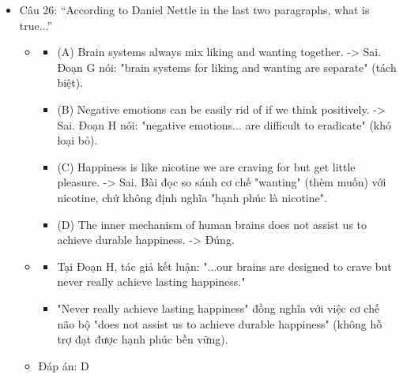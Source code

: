 \documentclass{../templateReading/cdreading}
\begin{document}
\begin{itemize}
\item Câu 26: “According to Daniel Nettle in the last two paragraphs, what is true...”
\begin{itemize}
\item {}
\begin{itemize}
\item (A) Brain systems always mix liking and wanting together. -> Sai. Đoạn G nói: "brain systems for liking and wanting are separate" (tách biệt).
\item (B) Negative emotions can be easily rid of if we think positively. -> Sai. Đoạn H nói: "negative emotions... are difficult to eradicate" (khó loại bỏ).
\item (C) Happiness is like nicotine we are craving for but get little pleasure. -> Sai. Bài đọc so sánh cơ chế "wanting" (thèm muốn) với nicotine, chứ không định nghĩa "hạnh phúc là nicotine".
\item (D) The inner mechanism of human brains does not assist us to achieve durable happiness. -> Đúng.
\end{itemize}
\item {}
\begin{itemize}
\item Tại Đoạn H, tác giả kết luận: "...our brains are designed to crave but never really achieve lasting happiness."
\item "Never really achieve lasting happiness" đồng nghĩa với việc cơ chế não bộ "does not assist us to achieve durable happiness" (không hỗ trợ đạt được hạnh phúc bền vững).
\end{itemize}
\item Đáp án: D
\end{itemize}
\end{itemize}
\end{document}
